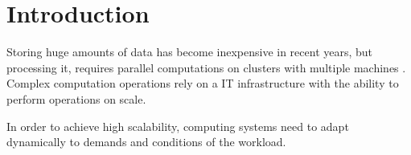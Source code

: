 \chapter{Introduction}
\label{sec:demo}
%





Storing huge amounts of data has become inexpensive in recent years, but processing it, requires 
parallel computations on clusters with multiple machines \cite{Chambers2018Spark}. Complex 
computation operations rely on a IT infrastructure with the ability to perform operations on scale. 

In order to achieve high scalability, computing systems need to adapt dynamically to demands and conditions of the workload.




